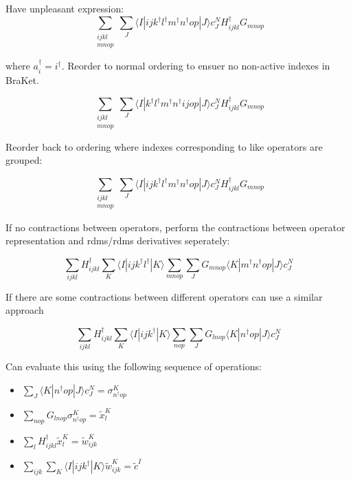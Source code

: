 \documentclass[12pt]{article}
\begin{document}
Have unpleasant expression:
\begin{equation}
\sum_{\substack{ ijkl \\ mnop } }\sum_{J} \langle I | ijk^{\dagger}l^{\dagger}m^{\dagger}n^{\dagger}op|J\rangle c_{J}^{N}H_{ijkl}^{\dagger}G_{mnop}
\end{equation}

\noindent where $a_{i}^{\dagger} = i^{\dagger}$. Reorder to normal ordering to ensuer no non-active indexes in BraKet.

\begin{equation}
\sum_{\substack{ ijkl \\ mnop } }\sum_{J} \langle I | k^{\dagger}l^{\dagger}m^{\dagger}n^{\dagger}ijop|J\rangle c_{J}^{N}H_{ijkl}^{\dagger}G_{mnop}
\end{equation}

\noindent Reorder back to ordering where indexes corresponding to like operators are grouped:

\begin{equation}
\sum_{\substack{ ijkl \\ mnop } }\sum_{J}\langle I | ijk^{\dagger}l^{\dagger}m^{\dagger}n^{\dagger}op|J\rangle c_{J}^{N}H_{ijkl}^{\dagger}G_{mnop}
\end{equation}

\noindent    If no contractions between operators, perform the contractions between operator representation and rdms/rdms derivatives seperately:

\begin{equation}
\sum_{ ijkl  }H_{ijkl}^{\dagger}\sum_{K} \langle I | ijk^{\dagger}l^{\dagger}|K\rangle
                         \sum_{mnop}\sum_{J}G_{mnop}\langle K | m^{\dagger}n^{\dagger}op|J\rangle c_{J}^{N}
\end{equation}

\noindent If there are some contractions between different operators can use a similar approach

\begin{equation}
\sum_{ ijkl  }H_{ijkl}^{\dagger} \sum_{K}\langle I | ijk^{\dagger}|K\rangle
                         \sum_{nop}\sum_{J}G_{lnop}\langle K | n^{\dagger}op|J\rangle c_{J}^{N}
\end{equation}

\noindent Can evaluate this using the following sequence of operations:

\begin{itemize}
\item $ \sum_{J}   \langle K | n^{\dagger}op|J\rangle c_{J}^{N} = \sigma_{n^{\dagger}op}^{K}$
\item $ \sum_{nop} G_{lnop}\sigma_{n^{\dagger}op}^{K} = \tilde{x}_{l}^{K}$
\item $\sum_{l} H_{ijkl}^{\dagger} \tilde{x}_{l}^{K} = \tilde{w}_{ijk}^{K} $
\item $ \sum_{ijk}\sum_{K} \langle I | ijk^{\dagger}|K\rangle \tilde{w}^{K}_{ijk} = \tilde{c}^{I} $ 
\end{itemize}
\end{document}
